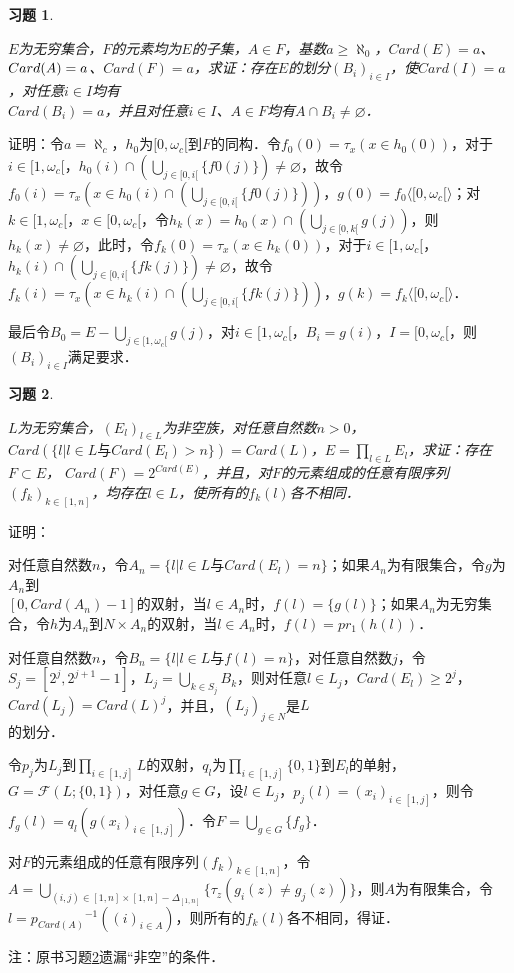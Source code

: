 \documentclass[12pt, a4paper, oneside]{book}
\newtheorem{exer}{习题}
\begin{document}
			\begin{exer}\label{exer181}
				\hfill\par
				$E$为无穷集合，$F$的元素均为$E$的子集，$A\in F$，基数$a\geq \aleph_0$，$Card(E)=a$、$Card(A)\\=a$、$Card(F)=a$，求证：存在$E$的划分$(B_i)_{i\in I}$，使$Card(I)=a$，对任意$i\in I$均有\\$Card(B_i)=a$，并且对任意$i\in I$、$A\in F$均有$A\cap B_i\neq \varnothing$．
			\end{exer}
			证明：令$a=\aleph_c$，$h_0$为$[0, \omega_c[$到$F$的同构．令$f_0(0)=\tau_x(x\in h_0(0))$，对于$i\in [1, \omega_c[$，$h_0(i)\cap(\bigcup\limits_{j\in [0, i[}\{f0(j)\})\neq \varnothing$，故令$f_0(i)=\tau_x(x\in h_0(i)\cap(\bigcup\limits_{j\in [0, i[}\{f0(j)\}))$，$g(0)=f_0\langle[0, \omega_c[\rangle$；对$k\in [1, \omega_c[$，$x\in [0, \omega_c[$，令$h_k(x)=h_0(x) \cap(\bigcup\limits_{j\in [0, k[}g(j))$，则$h_k(x)\neq \varnothing$，此时，令$f_k(0)=\tau_x(x\in h_k(0))$，对于$i\in [1, \omega_c[$，$h_k(i)\cap(\bigcup\limits_{j\in [0, i[}\{fk(j)\})\neq \varnothing$，故令$f_k(i)=\tau_x(x\in h_k(i)\cap(\bigcup\limits_{j\in [0, i[}\{fk(j)\}))$，$g(k)=f_k\langle[0, \omega_c[\rangle$．
			\par
			最后令$B_0=E-\bigcup\limits_{j\in [1, \omega_c[}g(j)$，对$i\in [1, \omega_c[$，$B_i=g(i)$，$I=[0, \omega_c[$，则$(B_i)_{i\in I}$满足要求．
			
			\begin{exer}\label{exer182}
				\hfill\par
				$L$为无穷集合，$(E_l)_{l\in L}$为非空族，对任意自然数$n>0$，$Card(\{l|l\in L\text{与}Card(E_l)>n\})=Card(L)$，$E=\prod\limits_{l\in L}E_l$，求证：存在$F\subset E$， $Card(F)=2^{Card(E)}$，并且，对$F$的元素组成的任意有限序列$(f_k)_{k\in [1, n]}$，均存在$l\in L$，使所有的$f_k(l)$各不相同．
			\end{exer}
			证明：
			\par
			对任意自然数$n$，令$A_n=\{l|l\in L\text{与}Card(E_l)=n\}$；如果$A_n$为有限集合，令$g$为$A_n$到\\$[0, Card(A_n)-1]$的双射，当$l\in A_n$时，$f(l)=\{g(l)\}$；如果$A_n$为无穷集合，令$h$为$A_n$到$N\times A_n$的双射，当$l\in A_n$时，$f(l)=pr_1(h(l))$．
			\par
			对任意自然数$n$，令$B_n=\{l|l\in L\text{与}f(l)=n\}$，对任意自然数$j$，令$S_j=[2^j, 2^{j+1}-1]$，$L_j=\bigcup\limits_{k\in S_j}B_k$，则对任意$l\in L_j$，$Card(E_l)\geq 2^j$，$Card(L_j)=Card(L)^j$，并且，$(L_j)_{j\in N}$是$L$\\的划分．
			\par
			令$p_j$为$L_j$到$\prod\limits_{i\in [1, j]}L$的双射，$q_l$为$\prod\limits_{i\in [1, j]}\{0, 1\}$到$E_l$的单射，$G=\mathcal{F}(L; \{0, 1\})$，对任意$g\in G$，设$l\in L_j$，$p_j(l)=(x_i)_{i\in [1, j]}$，则令$f_g(l)=q_l(g(x_i)_{i\in [1, j]})$．令$F=\bigcup\limits_{g\in G}\{f_g\}$．
			\par
			对$F$的元素组成的任意有限序列$(f_k)_{k\in [1, n]}$，令$A=\bigcup\limits_{(i, j)\in [1, n]\times [1, n]-\Delta_{[1, n]}}\{\tau_z(g_i(z)\neq g_j(z))\}$，则$A$为有限集合，令$l={p_{Card(A)}}^{-1}((i)_{i\in A})$，则所有的$f_k(l)$各不相同，得证．
			\par
			注：原书习题\ref{exer182}遗漏“非空”的条件．
			
\end{document}
